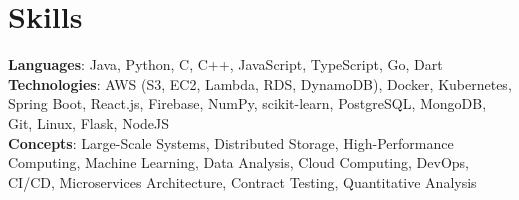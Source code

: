 \documentclass[letterpaper,11pt]{article}
\begin{document}
\section{Skills}
 \begin{itemize}[leftmargin=0.15in, label={}]
    \small{\item{
     \textbf{Languages}{: Java, Python, C, C++, JavaScript, TypeScript, Go, Dart} \\
     \textbf{Technologies}{: AWS (S3, EC2, Lambda, RDS, DynamoDB), Docker, Kubernetes, Spring Boot, React.js, Firebase, NumPy, scikit-learn, PostgreSQL, MongoDB, Git, Linux, Flask, NodeJS} \\
     \textbf{Concepts}{: Large-Scale Systems, Distributed Storage, High-Performance Computing, Machine Learning, Data Analysis, Cloud Computing, DevOps, CI/CD, Microservices Architecture, Contract Testing, Quantitative Analysis} }}
 \end{itemize}
 
%
\end{document}
